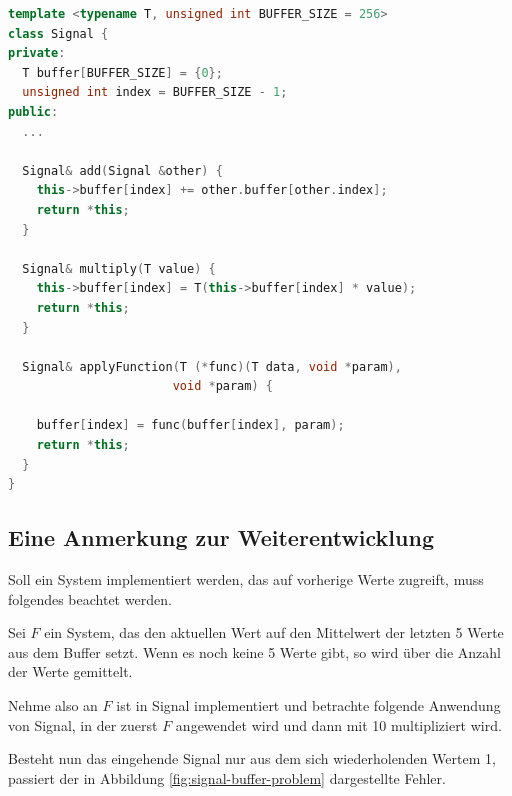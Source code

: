 \begin{lstlisting}[language=C++, 
                       frame=single, 
                       caption={Signalklasse Version 0.5},
                       captionpos=b]
template <typename T, unsigned int BUFFER_SIZE = 256>
class Signal {
private:
  T buffer[BUFFER_SIZE] = {0};
  unsigned int index = BUFFER_SIZE - 1;
public:
  ...

  Signal& add(Signal &other) {
    this->buffer[index] += other.buffer[other.index];
    return *this;
  }

  Signal& multiply(T value) {
    this->buffer[index] = T(this->buffer[index] * value);
    return *this;
  }

  Signal& applyFunction(T (*func)(T data, void *param), 
                       void *param) {

    buffer[index] = func(buffer[index], param);
    return *this;
  }
}
\end{lstlisting}

\subsection{Eine Anmerkung zur Weiterentwicklung}

Soll ein System implementiert werden, das auf vorherige Werte zugreift, 
muss folgendes beachtet werden.

Sei $F$ ein System, das den aktuellen Wert auf den Mittelwert der letzten 
5 Werte aus dem Buffer setzt.
Wenn es noch keine 5 Werte gibt, so wird über die Anzahl der Werte gemittelt.

Nehme also an $F$ ist in Signal implementiert und betrachte folgende Anwendung 
von Signal, in der zuerst $F$ angewendet wird und dann mit 10 multipliziert wird.

Besteht nun das eingehende Signal nur aus dem sich wiederholenden Wertem 1,
passiert der in Abbildung \ref{fig:signal-buffer-problem} dargestellte Fehler.

